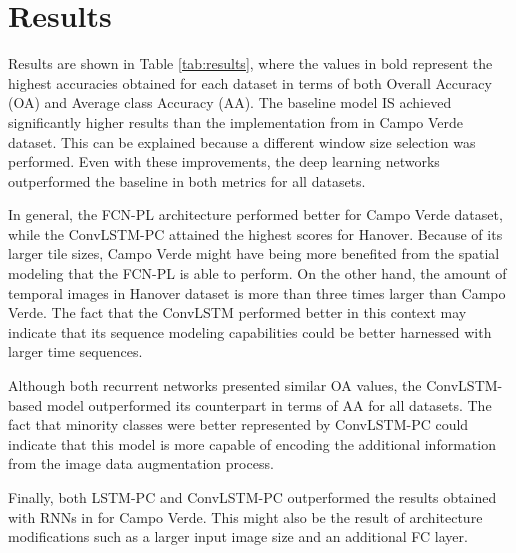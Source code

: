 
\section{Results}

Results are shown in Table \ref{tab:results}, where the values in bold represent the highest accuracies obtained for each dataset in terms of both Overall Accuracy (OA) and Average class Accuracy (AA). The baseline model IS achieved significantly higher results than the implementation from \cite{castro2017comparative} in Campo Verde dataset. This can be explained because a different window size selection was performed. Even with these improvements, the deep learning networks outperformed the baseline in both metrics for all datasets. 

In general, the FCN-PL architecture performed better for Campo Verde dataset, while the ConvLSTM-PC attained the highest scores for Hanover. Because of its larger tile sizes, Campo Verde might have being more benefited from the spatial modeling that the FCN-PL is able to perform. On the other hand, the amount of temporal images in Hanover dataset is more than three times larger than Campo Verde. The fact that the ConvLSTM performed better in this context may indicate that its sequence modeling capabilities could be better harnessed with larger time sequences.

Although both recurrent networks presented similar OA values, the ConvLSTM-based model outperformed its counterpart in terms of AA for all datasets. The fact that minority classes were better represented by ConvLSTM-PC could indicate that this model is more capable of encoding the additional information from the image data augmentation process.

Finally, both LSTM-PC and ConvLSTM-PC outperformed the results obtained with RNNs in \cite{rnnjose} for Campo Verde. This might also be the result of architecture modifications such as a larger input image size and an additional FC layer. 

\vspace{0.5cm}

